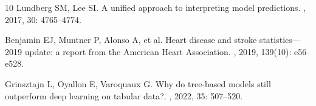 \documentclass[11pt,a4paper]{ctexart} %
\begin{document}
\begin{thebibliography}{10}
Lundberg SM, Lee SI.
\newblock A unified approach to interpreting model predictions.
, 2017, 30: 4765--4774.

Benjamin EJ, Muntner P, Alonso A, et al.
\newblock Heart disease and stroke statistics—2019 update: a report from the American Heart Association.
, 2019, 139(10): e56--e528.

Grinsztajn L, Oyallon E, Varoquaux G.
\newblock Why do tree-based models still outperform deep learning on tabular data?.
, 2022, 35: 507--520.

\end{thebibliography}
\end{document}
